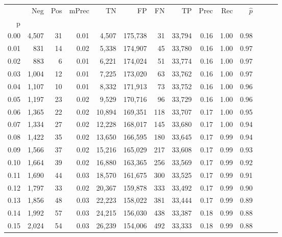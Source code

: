 \begin{tabular}{rrrrrrrrrrrrrr}
\toprule
{} &    Neg &    Pos & mPrec &       TN &       FP &      FN &      TP &  Prec &   Rec & $\hat{p}$ \\
p    &        &        &       &          &          &         &         &       &       &           \\
\midrule
0.00 &  4,507 &     31 &  0.01 &    4,507 &  175,738 &      31 &  33,794 &  0.16 &  1.00 &      0.98 \\
0.01 &    831 &     14 &  0.02 &    5,338 &  174,907 &      45 &  33,780 &  0.16 &  1.00 &      0.97 \\
0.02 &    883 &      6 &  0.01 &    6,221 &  174,024 &      51 &  33,774 &  0.16 &  1.00 &      0.97 \\
0.03 &  1,004 &     12 &  0.01 &    7,225 &  173,020 &      63 &  33,762 &  0.16 &  1.00 &      0.97 \\
0.04 &  1,107 &     10 &  0.01 &    8,332 &  171,913 &      73 &  33,752 &  0.16 &  1.00 &      0.96 \\
0.05 &  1,197 &     23 &  0.02 &    9,529 &  170,716 &      96 &  33,729 &  0.16 &  1.00 &      0.96 \\
0.06 &  1,365 &     22 &  0.02 &   10,894 &  169,351 &     118 &  33,707 &  0.17 &  1.00 &      0.95 \\
0.07 &  1,334 &     27 &  0.02 &   12,228 &  168,017 &     145 &  33,680 &  0.17 &  1.00 &      0.94 \\
0.08 &  1,422 &     35 &  0.02 &   13,650 &  166,595 &     180 &  33,645 &  0.17 &  0.99 &      0.94 \\
0.09 &  1,566 &     37 &  0.02 &   15,216 &  165,029 &     217 &  33,608 &  0.17 &  0.99 &      0.93 \\
0.10 &  1,664 &     39 &  0.02 &   16,880 &  163,365 &     256 &  33,569 &  0.17 &  0.99 &      0.92 \\
0.11 &  1,690 &     44 &  0.03 &   18,570 &  161,675 &     300 &  33,525 &  0.17 &  0.99 &      0.91 \\
0.12 &  1,797 &     33 &  0.02 &   20,367 &  159,878 &     333 &  33,492 &  0.17 &  0.99 &      0.90 \\
0.13 &  1,856 &     48 &  0.03 &   22,223 &  158,022 &     381 &  33,444 &  0.17 &  0.99 &      0.89 \\
0.14 &  1,992 &     57 &  0.03 &   24,215 &  156,030 &     438 &  33,387 &  0.18 &  0.99 &      0.88 \\
0.15 &  2,024 &     54 &  0.03 &   26,239 &  154,006 &     492 &  33,333 &  0.18 &  0.99 &      0.88 \\

\end{tabular}
